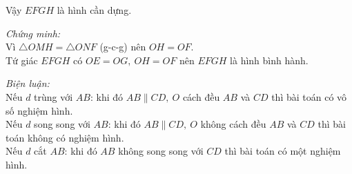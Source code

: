 \begin{vd}
{\begin{enumEX}[+)]{1}
	Vậy $ EFGH $ là hình cần dựng.
	\item \textit{Chứng minh:}\\
	Vì $ \triangle OMH=\triangle ONF $ (g-c-g) nên $ OH=OF $.\\
	Tứ giác $ EFGH $ có $ OE=OG,\ OH=OF $ nên $ EFGH $ là hình bình hành.
	\item \textit{Biện luận:}\\
	Nếu $ d $ trùng với $ AB $: khi đó $ AB\parallel CD,\ O $ cách đều $ AB $ và $ CD $ thì bài toán có vô số nghiệm hình.\\
	Nếu $ d $ song song với $ AB $: khi đó $ AB\parallel CD,\ O $ không cách đều $ AB $ và $ CD $ thì bài toán không có nghiệm hình.\\
	Nếu $ d $ cắt $ AB $: khi đó $ AB$ không song song với $ CD$ thì bài toán có một nghiệm hình.
\end{enumEX}
}
\end{vd}

